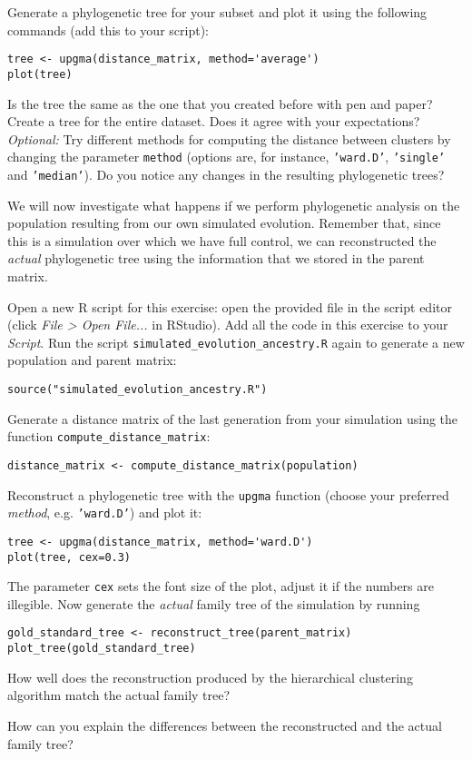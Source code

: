 \documentclass[a4paper, 9pt]{article}
\begin{document}
\begin{exercise}
    \action Generate a phylogenetic tree for your subset and plot it using the following commands (add this to your  script):\begin{lstlisting}
tree <- upgma(distance_matrix, method='average')
plot(tree)\end{lstlisting}
Is the tree the same as the one that you created before with pen and paper?
\action Create a tree for the entire dataset. Does it agree with your expectations?
\action \emph{Optional:} Try different methods for computing the distance between clusters by changing the parameter \texttt{method} (options are, for instance, \texttt{'ward.D'}, \texttt{'single'} and \texttt{'median'}). Do you notice any changes in the resulting phylogenetic trees?
\end{exercise}

We will now investigate what happens if we perform phylogenetic analysis
on the population resulting from our own simulated evolution. Remember
that, since this is a simulation over which we have full control, we can
reconstructed the \emph{actual} phylogenetic tree using the information
that we stored in the parent matrix.

\begin{exercise}
	\action Open a new R script for this exercise: open the provided  file in the script editor (click \emph{File > Open File...} in RStudio). Add all the code in this exercise to your \emph{Script}.
    \action Run the script \verb|simulated_evolution_ancestry.R| again to generate a new population and parent matrix:
    \begin{lstlisting}
source("simulated_evolution_ancestry.R")\end{lstlisting}
    \action Generate a distance matrix of the last generation from your simulation using the function \verb|compute_distance_matrix|:
    \begin{lstlisting}
distance_matrix <- compute_distance_matrix(population)
    \end{lstlisting}
    \action Reconstruct a phylogenetic tree with the \texttt{upgma} function (choose your preferred \textit{method}, e.g. \texttt{'ward.D'}) and plot it:
    \begin{lstlisting}
tree <- upgma(distance_matrix, method='ward.D')
plot(tree, cex=0.3)
    \end{lstlisting}    
    The parameter \texttt{cex} sets the font size of the plot, adjust it if the numbers are illegible.
    \action Now generate the \textit{actual} family tree of the simulation by running\begin{lstlisting}
gold_standard_tree <- reconstruct_tree(parent_matrix)
plot_tree(gold_standard_tree)
\end{lstlisting} 
How well does the reconstruction produced by the hierarchical clustering algorithm match the actual family tree?

\askstar How can you explain the differences between the reconstructed and the actual family tree?
\end{exercise}
\end{document}
